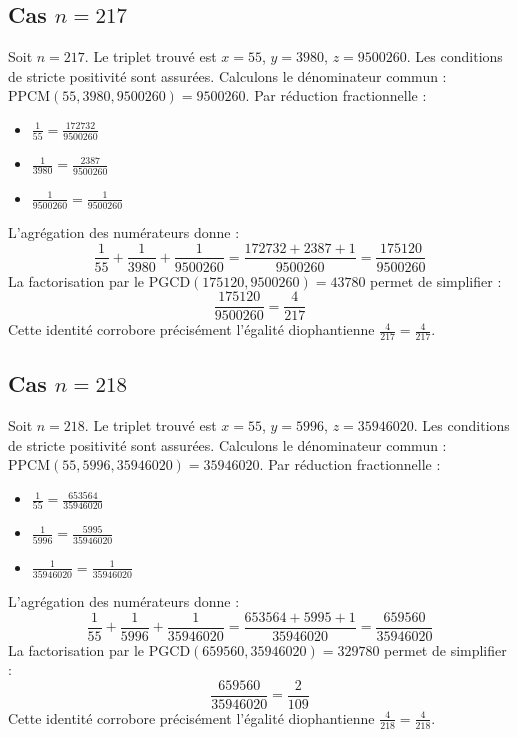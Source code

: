 \documentclass[11pt,a4paper]{article}
\begin{document}
\subsection{Cas $n = 217$}
Soit $n = 217$. Le triplet trouvé est $x = 55$, $y = 3980$, $z = 9500260$.
Les conditions de stricte positivité sont assurées.
Calculons le dénominateur commun : $\text{PPCM}(55, 3980, 9500260) = 9500260$.
Par réduction fractionnelle :
\begin{itemize}
    \item $\frac{1}{55} = \frac{172732}{9500260}$
    \item $\frac{1}{3980} = \frac{2387}{9500260}$
    \item $\frac{1}{9500260} = \frac{1}{9500260}$
\end{itemize}
L'agrégation des numérateurs donne :
$$ \frac{1}{55} + \frac{1}{3980} + \frac{1}{9500260} = \frac{172732 + 2387 + 1}{9500260} = \frac{175120}{9500260} $$
La factorisation par le $\text{PGCD}(175120, 9500260) = 43780$ permet de simplifier :
$$ \frac{175120}{9500260} = \frac{4}{217} $$
Cette identité corrobore précisément l'égalité diophantienne $\frac{4}{217} = \frac{4}{217}$.

\subsection{Cas $n = 218$}
Soit $n = 218$. Le triplet trouvé est $x = 55$, $y = 5996$, $z = 35946020$.
Les conditions de stricte positivité sont assurées.
Calculons le dénominateur commun : $\text{PPCM}(55, 5996, 35946020) = 35946020$.
Par réduction fractionnelle :
\begin{itemize}
    \item $\frac{1}{55} = \frac{653564}{35946020}$
    \item $\frac{1}{5996} = \frac{5995}{35946020}$
    \item $\frac{1}{35946020} = \frac{1}{35946020}$
\end{itemize}
L'agrégation des numérateurs donne :
$$ \frac{1}{55} + \frac{1}{5996} + \frac{1}{35946020} = \frac{653564 + 5995 + 1}{35946020} = \frac{659560}{35946020} $$
La factorisation par le $\text{PGCD}(659560, 35946020) = 329780$ permet de simplifier :
$$ \frac{659560}{35946020} = \frac{2}{109} $$
Cette identité corrobore précisément l'égalité diophantienne $\frac{4}{218} = \frac{4}{218}$.
\end{document}
